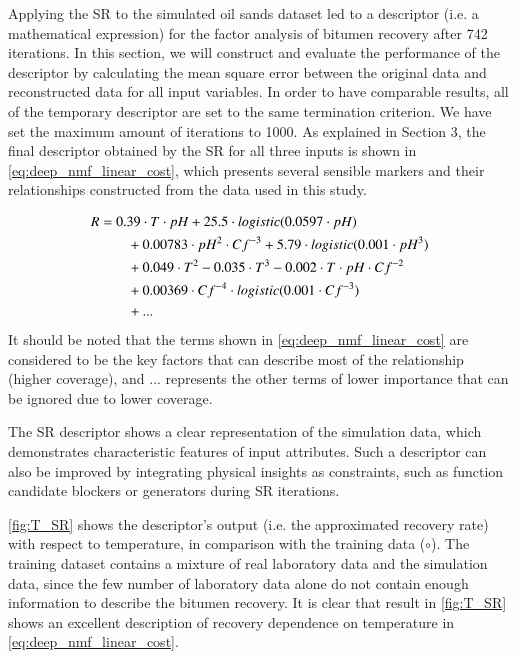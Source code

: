 \documentclass[final,5p,times,twocolumn]{elsarticle}
\begin{document}
Applying the SR to the simulated oil sands dataset led to a descriptor (i.e. a mathematical expression) for the factor analysis of bitumen recovery after 742 iterations. 
In this section, we will construct and evaluate the performance of the descriptor by calculating the mean square error between the original data and reconstructed data for all input variables. In order to have comparable results, all of the temporary descriptor are set to the same termination criterion. We have set the maximum amount of iterations to 1000. As explained in Section 3, the final descriptor obtained by the SR for all three inputs is shown in \autoref{eq:deep_nmf_linear_cost}, which presents several sensible markers and their relationships constructed from the data used in this study. 


\begin{align} \label{eq:deep_nmf_linear_cost}
\notag    R &=  0.39 \cdot T \cdot pH + 25.5 \cdot logistic(0.0597 \cdot pH)\\\notag 
&\qquad + 0.00783 \cdot pH^2 \cdot Cf^{-3} + 5.79 \cdot logistic(0.001 \cdot pH^3)\\\notag 
&\qquad +0.049 \cdot T^2 -0.035 \cdot T^3-0.002\cdot T \cdot pH \cdot Cf^{-2}\\\notag 
&\qquad + 0.00369 \cdot Cf^{-4} \cdot logistic(0.001 \cdot Cf^{-3})\\\notag
&\qquad +...\\
\end{align}
It should be noted that the terms shown in \autoref{eq:deep_nmf_linear_cost} are considered to be the key factors that can describe most of the relationship (higher coverage), and ... represents the other terms of lower importance that can be ignored due to lower coverage.

The SR descriptor shows a clear representation of the simulation data, which demonstrates characteristic features of input attributes. Such a descriptor can also be improved by integrating physical insights as constraints, such as function candidate blockers or generators during SR iterations.
 
\autoref{fig:T_SR} shows the descriptor's output (i.e. the approximated recovery rate) with respect to temperature, in comparison with the training data ($\circ$). The training dataset contains a mixture of real laboratory data and the simulation data, since the few number of laboratory data alone do not contain enough information to describe the bitumen recovery. It is clear that result in \autoref{fig:T_SR} shows an excellent description of recovery dependence on temperature in \autoref{eq:deep_nmf_linear_cost}.
\end{document}
